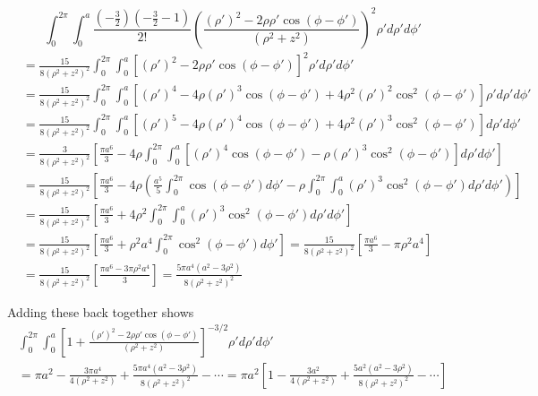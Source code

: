 \documentclass{article}
\begin{document}
\[ \int_{0}^{2\pi}\int_{0}^{a} \frac{(-\frac{3}{2})(-\frac{3}{2}-1)}{2!}\left( \frac{(\rho')^{2} - 2\rho\rho'\cos(\phi-\phi')}{(\rho^{2} + z^{2})} \right)^{2} \rho' d\rho'd\phi' \]
\begin{align*}
&= \frac{15}{8(\rho^{2} + z^{2})^{2}} \int_{0}^{2\pi}\int_{0}^{a} \left[ (\rho')^{2} - 2\rho\rho'\cos(\phi-\phi') \right]^{2} \rho' d\rho'd\phi'\\
&= \frac{15}{8(\rho^{2} + z^{2})^{2}} \int_{0}^{2\pi}\int_{0}^{a} \left[ (\rho')^{4} - 4\rho(\rho')^{3}\cos(\phi-\phi') + 4\rho^{2}(\rho')^{2}\cos^{2}(\phi-\phi') \right] \rho' d\rho'd\phi'\\
&= \frac{15}{8(\rho^{2} + z^{2})^{2}} \int_{0}^{2\pi}\int_{0}^{a} \left[ (\rho')^{5} - 4\rho(\rho')^{4}\cos(\phi-\phi') + 4\rho^{2}(\rho')^{3}\cos^{2}(\phi-\phi') \right] d\rho'd\phi'\\
&= \frac{3}{8(\rho^{2} + z^{2})^{2}} \left[ \frac{\pi a^{6}}{3} - 4\rho \int_{0}^{2\pi}\int_{0}^{a} \left[ (\rho')^{4}\cos(\phi-\phi') - \rho(\rho')^{3}\cos^{2}(\phi-\phi') \right] d\rho'd\phi' \right]\\
&= \frac{15}{8(\rho^{2} + z^{2})^{2}} \left[ \frac{\pi a^{6}}{3} - 4\rho \left( \frac{a^{5}}{5} \int_{0}^{2\pi} \cos(\phi-\phi') d\phi' - \rho \int_{0}^{2\pi}\int_{0}^{a} (\rho')^{3}\cos^{2}(\phi-\phi') d\rho'd\phi' \right) \right]\\
&= \frac{15}{8(\rho^{2} + z^{2})^{2}} \left[ \frac{\pi a^{6}}{3} + 4\rho^{2} \int_{0}^{2\pi}\int_{0}^{a} (\rho')^{3}\cos^{2}(\phi-\phi') d\rho'd\phi' \right]\\
&= \frac{15}{8(\rho^{2} + z^{2})^{2}} \left[ \frac{\pi a^{6}}{3} + \rho^{2}a^{4} \int_{0}^{2\pi} \cos^{2}(\phi-\phi') d\phi' \right] = \frac{15}{8(\rho^{2} + z^{2})^{2}} \left[ \frac{\pi a^{6}}{3} - \pi\rho^{2}a^{4} \right]\\
&= \frac{15}{8(\rho^{2} + z^{2})^{2}} \left[ \frac{\pi a^{6} - 3\pi\rho^{2}a^{4}}{3} \right] = \boxed{\frac{5\pi a^{4}(a^{2} - 3\rho^{2})}{8(\rho^{2} + z^{2})^{2}}}
\end{align*}

Adding these back together shows
\begin{multline*}
\int_{0}^{2\pi}\int_{0}^{a} \left[1 + \frac{(\rho')^{2} - 2\rho\rho'\cos(\phi-\phi')}{(\rho^{2} + z^{2})}\right]^{-3/2} \rho' d\rho'd\phi'\\
= \pi a^{2} - \frac{3\pi a^{4}}{4(\rho^{2} + z^{2})} + \frac{5\pi a^{4}(a^{2} - 3\rho^{2})}{8(\rho^{2} + z^{2})^{2}} - \cdots = \boxed{\pi a^{2} \left[ 1 - \frac{3a^{2}}{4(\rho^{2} + z^{2})} + \frac{5a^{2}(a^{2} - 3\rho^{2})}{8(\rho^{2} + z^{2})^{2}} - \cdots \right]}
\end{multline*}
\end{document}
